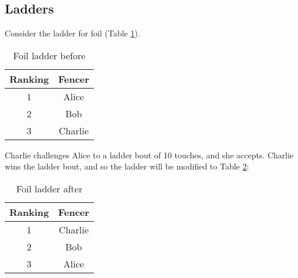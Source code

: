 \documentclass{article}
\begin{document}
\subsection{Ladders}
Consider the ladder for foil (Table \ref{tab:foil}).
\begin{table}[ht]
    \centering
    \begin{tabular}{|c|c|}
        \hline
        Ranking & Fencer \\ \hline
        1 & Alice \\ \hline
        2 & Bob \\ \hline
        3 & Charlie \\ \hline
    \end{tabular}
    \caption{Foil ladder before}
    \label{tab:foil}
\end{table}
Charlie challenges Alice to a ladder bout of 10 touches, and she accepts. Charlie wins the ladder bout, and so the ladder will be modified to Table \ref{tab:foil2}:
\begin{table}[ht]
    \centering
    \begin{tabular}{|c|c|}
        \hline
        Ranking & Fencer \\ \hline
        1 & Charlie \\ \hline
        2 & Bob \\ \hline
        3 & Alice \\ \hline
    \end{tabular}
    \caption{Foil ladder after}
    \label{tab:foil2}
\end{table}
\end{document}
